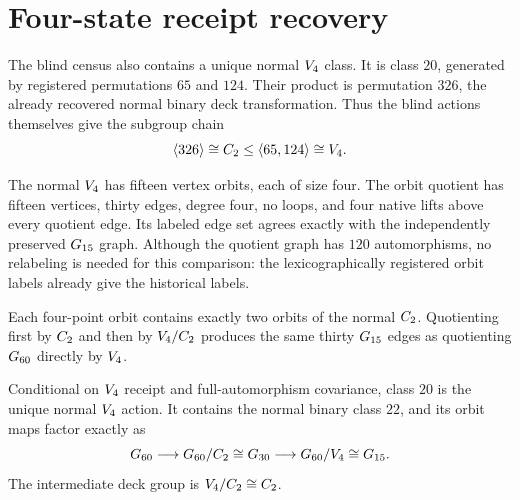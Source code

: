 \section{Four-state receipt recovery}

The blind census also contains a unique normal \(V_{4}\) class.  It is
class \(20\), generated by registered permutations \(65\) and \(124\).
Their product is permutation \(326\), the already recovered normal
binary deck transformation.  Thus the blind actions themselves give
the subgroup chain
\[
  \langle326\rangle
  \cong C_{2}
  \leq
  \langle65,124\rangle
  \cong V_{4}.
\]

The normal \(V_{4}\) has fifteen vertex orbits, each of size four.
The orbit quotient has fifteen vertices, thirty edges, degree four,
no loops, and four native lifts above every quotient edge.  Its labeled
edge set agrees exactly with the independently preserved
\(G_{15}\) graph.  Although the quotient graph has \(120\)
automorphisms, no relabeling is needed for this comparison: the
lexicographically registered orbit labels already give the historical
labels.

Each four-point orbit contains exactly two orbits of the normal
\(C_{2}\).  Quotienting first by \(C_{2}\) and then by
\(V_{4}/C_{2}\) produces the same thirty \(G_{15}\) edges as
quotienting \(G_{60}\) directly by \(V_{4}\).

\begin{theorem}
Conditional on \(V_{4}\) receipt and full-automorphism covariance,
class \(20\) is the unique normal \(V_{4}\) action.  It contains the
normal binary class \(22\), and its orbit maps factor exactly as
\[
  G_{60}
  \longrightarrow
  G_{60}/C_{2}\cong G_{30}
  \longrightarrow
  G_{60}/V_{4}\cong G_{15}.
\]
The intermediate deck group is
\(V_{4}/C_{2}\cong C_{2}\).
\end{theorem}
